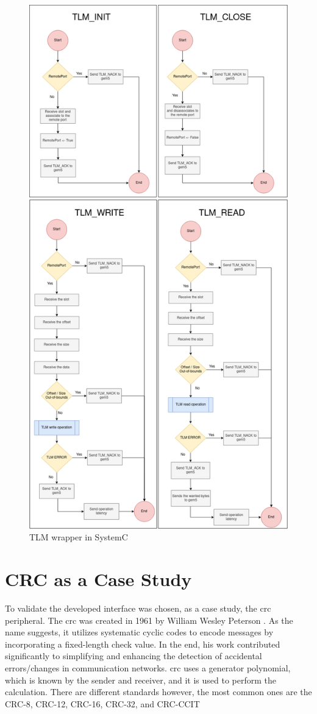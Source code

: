\begin{figure}[H]
	\centering
 	\includegraphics[width=0.7\linewidth]{Images/TLMWrapper_SystemC.png} 
 	\caption{TLM wrapper in SystemC}
\end{figure}

\section{CRC as a Case Study}

To validate the developed interface was chosen, as a case study, the \gls{crc} peripheral. 
The \gls{crc} was created in 1961 by William Wesley Peterson \cite{peterson1961cyclic}. As the name suggests, 
it utilizes systematic cyclic codes to encode messages by incorporating a fixed-length check value. In the end, his work
contributed significantly to simplifying and enhancing the detection of accidental errors/changes in communication 
networks. \gls{crc} uses a generator polynomial, which is known by the sender and receiver, and it is used to 
perform the calculation. There are different standards however, the most common ones are the CRC-8, CRC-12, CRC-16, 
CRC-32, and CRC-CCIT \cite{borrelli2001ieee}

